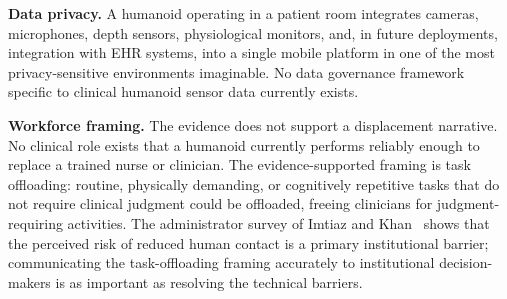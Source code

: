 \textbf{Data privacy.} A humanoid operating in a patient room integrates cameras,
microphones, depth sensors, physiological monitors, and, in future deployments,
integration with EHR systems, into a single mobile platform in one of the most
privacy-sensitive environments imaginable. No data governance framework specific
to clinical humanoid sensor data currently exists.

\textbf{Workforce framing.} The evidence does not support a displacement
narrative. No clinical role exists that a humanoid currently performs reliably
enough to replace a trained nurse or clinician. The evidence-supported framing is
task offloading: routine, physically demanding, or cognitively repetitive tasks
that do not require clinical judgment could be offloaded, freeing clinicians for
judgment-requiring activities. The administrator survey of Imtiaz and
Khan~\cite{imtiaz2024perceptions} shows that the perceived risk of reduced human
contact is a primary institutional barrier; communicating the task-offloading
framing accurately to institutional decision-makers is as important as resolving
the technical barriers.
